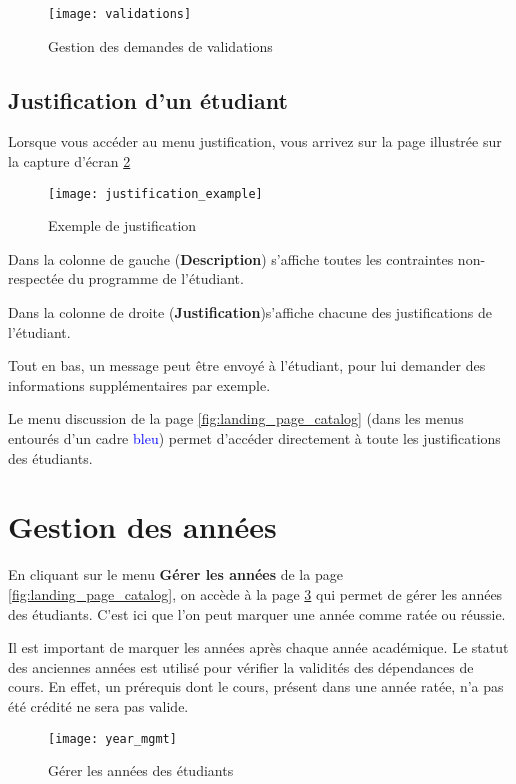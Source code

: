\begin{figure}[htb]
\centering
\caption{Gestion des demandes de validations}
\label{fig:validations}
\texttt{[image: validations]}
\end{figure}
\subsection{Justification d'un étudiant}
Lorsque vous accéder au menu justification, vous arrivez sur la page illustrée sur la capture d'écran \ref{fig:justification_example}

\begin{figure}[htb]
\centering
\caption{Exemple de justification}
\label{fig:justification_example}
\texttt{[image: justification\_example]}
\end{figure}

Dans la colonne de gauche (\textbf{Description}) s'affiche toutes les contraintes non-respectée du programme de l'étudiant. 

Dans la colonne de droite (\textbf{Justification})s'affiche chacune des justifications de l'étudiant.

Tout en bas, un message peut être envoyé à l'étudiant, pour lui demander des informations supplémentaires par exemple. 

Le menu discussion de la page \ref{fig:landing_page_catalog} (dans les menus entourés d'un cadre \textcolor{blue}{bleu}) permet d'accéder directement à toute les justifications des étudiants.

\section{Gestion des années}

En cliquant sur le menu \textbf{Gérer les années} de la page \ref{fig:landing_page_catalog}, on accède à la page \ref{fig:manage_years} qui permet de gérer les années des étudiants. C'est ici que l'on peut marquer une année comme ratée ou réussie. 

Il est important de marquer les années après chaque année académique. Le statut des anciennes années est utilisé pour vérifier la validités des dépendances de cours. En effet, un prérequis dont le cours, présent dans une année ratée, n'a pas été crédité ne sera pas valide. 

\begin{figure}[htb]
\centering
\caption{Gérer les années des étudiants}
\label{fig:manage_years}
\texttt{[image: year\_mgmt]}
\end{figure}

